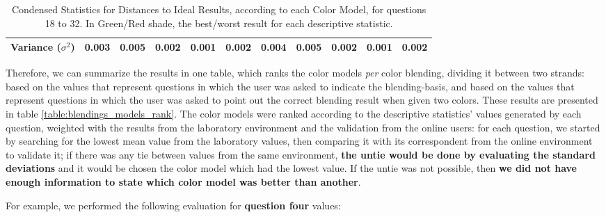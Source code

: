 \begin{itemize}
\begin{table}[htbp]
{\begin{tabular}{@{}ccccccccccc@{}}
      \multicolumn{1}{c|}{Variance ($\sigma^2$)}                                         & \cellcolor[HTML]{FFFFFF}0.003         & \cellcolor[HTML]{FD6864}\textbf{0.005} & \cellcolor[HTML]{FFFFFF}0.002         & \cellcolor[HTML]{32CB00}\textbf{0.001} & \multicolumn{1}{c|}{\cellcolor[HTML]{FFFFFF}0.002}         & \cellcolor[HTML]{FFFFFF}0.004         & \cellcolor[HTML]{FD6864}\textbf{0.005} & \cellcolor[HTML]{FFFFFF}0.002         & \cellcolor[HTML]{32CB00}\textbf{0.001} & \multicolumn{1}{c|}{\cellcolor[HTML]{FFFFFF}0.002} \\ \bottomrule
    \end{tabular}}
    \caption[Condensed Statistics for Distances to Ideal Results, according to each Color Model, for questions 18 to 32.]{Condensed Statistics for Distances to Ideal Results, according to each Color Model, for questions 18 to 32. In Green/Red shade, the best/worst result for each descriptive statistic.}
    \label{table:colormodels_expectations_labonline_statistics}
  \end{table}
\end{itemize} \par
%
Therefore, we can summarize the results in one table, which ranks the color models \emph{per} color blending, dividing it between two strands: based on the values that represent questions in which the user was
asked to indicate the blending-basis, and based on the values that represent questions in which the user was asked to point out the correct blending result when given two colors. These results are presented in
table \ref{table:blendings_models_rank}. The color models were ranked according to the descriptive statistics' values generated by each question, weighted with the results from the laboratory environment and the
validation from the online users: for each question, we started by searching for the lowest mean value from the laboratory values, then comparing it with its correspondent from the online environment to validate
it; if there was any tie between values from the same environment, \textbf{the untie would be done by evaluating the standard deviations} and it would be chosen the color model which had the lowest value. If the
untie was not possible, then \textbf{we did not have enough information to state which color model was better than another}. \par
%
For example, we performed the following evaluation for \textbf{question four} values:
%
